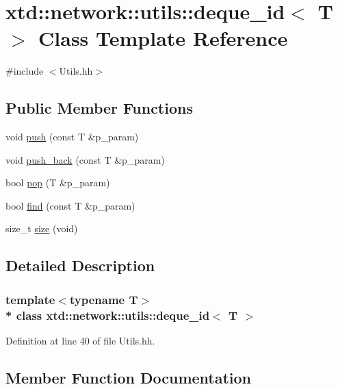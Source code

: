 \hypertarget{classxtd_1_1network_1_1utils_1_1deque__id}{}\section{xtd\+:\+:network\+:\+:utils\+:\+:deque\+\_\+id$<$ T $>$ Class Template Reference}
\label{classxtd_1_1network_1_1utils_1_1deque__id}


{\ttfamily \#include $<$Utils.\+hh$>$}

\subsection*{Public Member Functions}
\begin{DoxyCompactItemize}
\item 
void \hyperlink{classxtd_1_1network_1_1utils_1_1deque__id_ace5bd507db72397f457723944c21b575}{push} (const T \&p\+\_\+param)
\item 
void \hyperlink{classxtd_1_1network_1_1utils_1_1deque__id_ae947d106bc8943450c1eab9df3880401}{push\+\_\+back} (const T \&p\+\_\+param)
\item 
bool \hyperlink{classxtd_1_1network_1_1utils_1_1deque__id_a4d61e0412fbc4bb454141e8f760d191b}{pop} (T \&p\+\_\+param)
\item 
bool \hyperlink{classxtd_1_1network_1_1utils_1_1deque__id_ad18ee554089fe3016e1dd4c7b363c6a8}{find} (const T \&p\+\_\+param)
\item 
size\+\_\+t \hyperlink{classxtd_1_1network_1_1utils_1_1deque__id_a6038f59387bc5dcffb339b0d8c9424fa}{size} (void)
\end{DoxyCompactItemize}


\subsection{Detailed Description}
\subsubsection*{template$<$typename T$>$\\*
class xtd\+::network\+::utils\+::deque\+\_\+id$<$ T $>$}



Definition at line 40 of file Utils.\+hh.



\subsection{Member Function Documentation}
